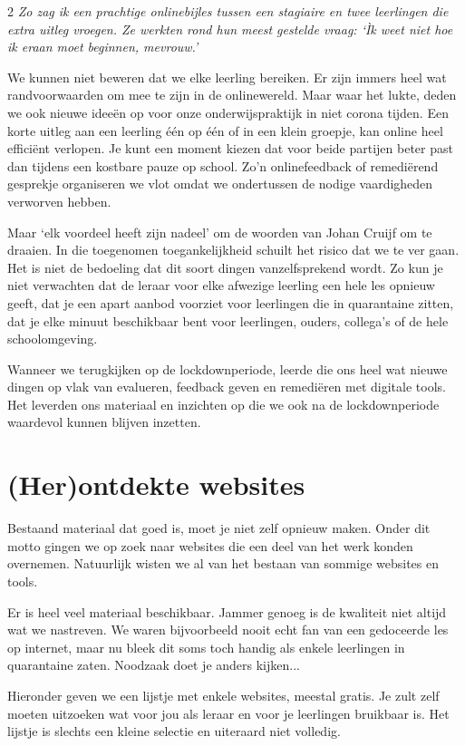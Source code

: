 \begin{multicols} {2}
\emph{Zo zag ik een prachtige onlinebijles tussen een stagiaire en twee leerlingen die extra uitleg vroegen. Ze werkten rond hun meest gestelde vraag: `Ìk weet niet hoe ik eraan moet beginnen, mevrouw.'}

We kunnen niet beweren dat we elke leerling bereiken. Er zijn immers heel wat randvoorwaarden om mee te zijn in de onlinewereld. Maar waar het lukte, deden we ook nieuwe ideeën op voor onze onderwijspraktijk in niet corona tijden. Een korte uitleg aan een leerling één op één of in een klein groepje, kan online heel efficiënt verlopen. Je kunt een moment kiezen dat voor beide partijen beter past dan tijdens een kostbare pauze op school. Zo'n onlinefeedback of remediërend gesprekje organiseren we vlot omdat we ondertussen de nodige vaardigheden verworven hebben. 

Maar `elk voordeel heeft zijn nadeel' om de woorden van Johan Cruijf om te draaien. In die toegenomen toegankelijkheid schuilt het risico dat we te ver gaan. Het is niet de bedoeling dat dit soort dingen vanzelfsprekend wordt. Zo kun je niet verwachten dat de leraar voor elke afwezige leerling een hele les opnieuw geeft, dat je een apart aanbod voorziet voor leerlingen die in quarantaine zitten, dat je elke minuut beschikbaar bent voor leerlingen, ouders, collega's of de hele schoolomgeving.

Wanneer we terugkijken op de lockdownperiode, leerde die ons heel wat nieuwe dingen op vlak van evalueren, feedback geven en remediëren met digitale tools. Het leverden ons materiaal en inzichten op die we ook na de lockdownperiode waardevol kunnen blijven inzetten. 

\section{(Her)ontdekte websites}

Bestaand materiaal dat goed is, moet je niet zelf opnieuw maken. Onder dit motto gingen we op zoek naar websites die een deel van het werk konden overnemen. Natuurlijk wisten we al van het bestaan van sommige websites en tools. 

Er is heel veel materiaal beschikbaar. Jammer genoeg is de kwaliteit niet altijd wat we nastreven. We waren bijvoorbeeld nooit echt fan van een gedoceerde les op internet, maar nu bleek dit soms toch handig als enkele leerlingen in quarantaine zaten. Noodzaak doet je anders kijken...

Hieronder geven we een lijstje met enkele websites, meestal gratis. Je zult zelf moeten uitzoeken wat voor jou als leraar en voor je leerlingen bruikbaar is. Het lijstje is slechts een kleine selectie en uiteraard niet volledig.
 

\end{multicols}
